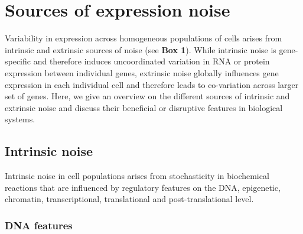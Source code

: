 
\section{Sources of expression noise} 

Variability in expression across homogeneous populations of cells arises from intrinsic and extrinsic sources of noise (see \textbf{Box 1}). While intrinsic noise is gene-specific and therefore induces uncoordinated variation in RNA or protein expression between individual genes, extrinsic noise globally influences gene expression in each individual cell and therefore leads to co-variation across larger set of genes. Here, we give an overview on the different sources of intrinsic and extrinsic noise and discuss their beneficial or disruptive features in biological systems.

\subsection{Intrinsic noise}

Intrinsic noise in cell populations arises from stochasticity in biochemical reactions that are influenced by regulatory features on the DNA, epigenetic, chromatin, transcriptional, translational and post-translational level.   

\subsubsection{DNA features}

